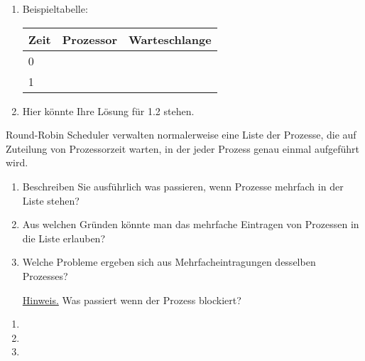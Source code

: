 \documentclass{uebungsblatt}
\begin{document}
\begin{loesung}
\begin{enumerate}
    \item Beispieltabelle:
        \begin{center}
            \begin{tabular}{l|l|l}
    		Zeit & Prozessor & Warteschlange \\
    		\hline
    		0 &  &  \\
    		1 &  &  \\
    	    \end{tabular}
        \end{center}
    \item Hier könnte Ihre Lösung für 1.2 stehen.
\end{enumerate}

\end{loesung}
\newpage
\begin{aufgabe}
Round-Robin Scheduler verwalten normalerweise eine Liste der
Prozesse, die auf Zuteilung von Prozessorzeit warten, in der jeder Prozess
genau einmal aufgeführt wird. 

\begin{enumerate}
\item
Beschreiben Sie ausführlich was passieren, wenn Prozesse mehrfach in der Liste stehen? \\

\item
Aus welchen Gründen könnte man das mehrfache Eintragen von Prozessen
in die Liste erlauben? \\

\item
Welche Probleme ergeben sich aus Mehrfacheintragungen desselben Prozesses?\\

\underline{Hinweis.}
Was passiert wenn der Prozess blockiert?

\end{enumerate}
\end{aufgabe}
\begin{loesung}
    \begin{enumerate}
        \item 
        \item 
        \item
    \end{enumerate}
\end{loesung}
\end{document}

